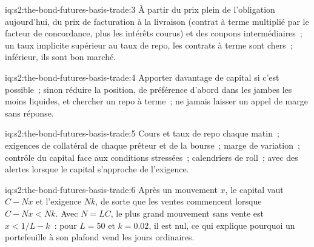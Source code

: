 \begin{solution}{iq:s2:the-bond-futures-basis-trade:3}
À partir du prix plein de l'obligation aujourd'hui, du prix de facturation à la livraison (contrat à terme multiplié par le facteur de concordance, plus les intérêts courus) et des coupons intermédiaires~; un taux implicite
supérieur au taux de repo, les contrats à terme sont chers~; inférieur, ils sont bon marché.
\end{solution}

\begin{solution}{iq:s2:the-bond-futures-basis-trade:4}
Apporter davantage de capital si c'est possible~; sinon réduire la position, de préférence d'abord dans les jambes les moins liquides, et chercher un repo à terme~; ne jamais laisser
un appel de marge sans réponse.
\end{solution}

\begin{solution}{iq:s2:the-bond-futures-basis-trade:5}
Cours et taux de repo chaque matin~; exigences de collatéral de chaque prêteur et de la bourse~; marge de variation~; contrôle du capital face aux conditions
stressées~; calendriers de roll~; avec des alertes lorsque le capital s'approche de l'exigence.
\end{solution}

\begin{solution}{iq:s2:the-bond-futures-basis-trade:6}
Après un mouvement $x$, le capital vaut $C - Nx$ et l'exigence $Nk$, de sorte que les ventes commencent lorsque $C - Nx < Nk$. Avec $N = LC$, le plus grand mouvement sans vente est
$x < 1/L - k$~: pour $L = 50$ et $k = 0.02$, il est nul, ce qui explique pourquoi un portefeuille à son plafond vend les jours ordinaires.
\end{solution}
